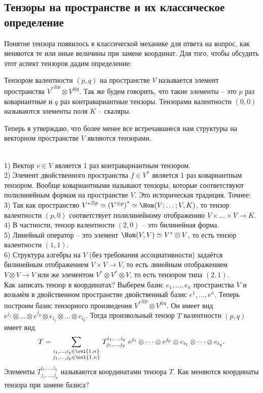 \endproof 
\ethrm


\subsection{Тензоры на пространстве и их классическое определение}

Понятие тензора появилось в классической механике для ответа на вопрос, как меняются те или иные величины при замене координат. Для того, чтобы обсудить этот аспект тензоров дадим определение:

\dfn Тензором валентности $(p,q)$ на пространстве $V$ называется элемент пространства ${V^{*}}^{\otimes p} \otimes V^{\otimes q}$. Так же будем говорить, что такие элементы -- это $p$ раз ковариантные и $q$ раз контравариантные тензоры. Тензорами валентности $(0,0)$ называются элементы поля $K$ -- скаляры.
\edfn

Теперь я утверждаю, что более менее все встречавшиеся нам структуры на векторном пространстве $V$ являются тензорами.



\exm\\
1) Вектор $v\in V$ является 1 раз контравариантным тензором.\\
2) Элемент двойственного пространства $f \in V^{*}$ является 1 раз ковариантным тензором. Вообще ковариантными называют тензоры, которые соответствуют полилинейным формам на пространстве $V$. Это историческая традиция. Точнее:\\
3) Так как пространство ${V^{*}}^{\otimes p} \simeq \left(V^{\otimes p}\right)^*\simeq \Hom(V;\dots;V,K)$, то тензор валентности $(p,0)$ соответствует полилинейному отображению $V\times\dots \times V \to K$.\\
4) В частности, тензор валентности $(2,0)$ -- это билинейная форма.\\
5) Линейный оператор -- это элемент $\Hom(V,V)\simeq V^{*}\otimes V$, то есть тензор валентности $(1,1)$.\\
6) Структура алгебры на $V$ (без требования ассоциативности) задаётся билинейным отображением $V \times V \to V$, то есть линейным отображением $V\otimes V \to V$ или же элементом $V^{*}\otimes V^* \otimes V$, то есть тензором типа $(2,1)$.\\

Как записать тензор в координатах? Выберем базис $e_1,\dots,e_n$ пространства $V$ и возьмём в двойственном пространстве двойственный базис $e^1,\dots,e^n$. Теперь построим базис тензорного произведения ${V^{*}}^{\otimes p}\otimes V^{\otimes q}$. Он имеет вид $e^{j_1}\otimes\dots\otimes e^{j_p}\otimes e_{i_1}\otimes \dots \otimes e_{i_q}$. Тогда произвольный тензор $T$ валентности $(p,q)$ имеет вид 
$$ T= \sum_{\substack{i_1,\dots,i_q \in \ovl{1,n}\\ j_1,\dots,j_p \in \ovl{1,n}} } \,T_{j_1,\dots,j_p}^{i_1,\dots,i_q}\,\, e^{j_1}\otimes\dots\otimes e^{j_p}\otimes e_{i_1}\otimes \dots \otimes e_{i_q}.$$
Элементы $T_{j_1,\dots,j_p}^{i_1,\dots,i_q}$ называются координатами тензора $T$. Как меняются координаты тензора при замене базиса? 

